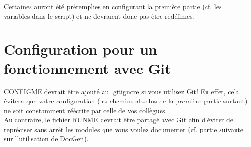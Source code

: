 \documentclass[./standalone.tex]{subfiles}
\begin{document}
Certaines auront été préremplies en configurant la première partie (cf. les variables dans le script) et ne devraient donc pas être redéfinies.\\
\bigskip

\section{Configuration pour un fonctionnement avec Git}
CONFIGME devrait être ajouté au .gitignore si vous utilisez Git! En effet, cela évitera que votre configuration (les chemins absolus de la première partie surtout) ne soit constamment réécrite par celle de vos collègues.\\

Au contraire, le fichier RUNME devrait être partagé avec Git afin d'éviter de repréciser sans arrêt les modules que vous voulez documenter (cf. partie suivante sur l'utilisation de DocGen).
\end{document}
